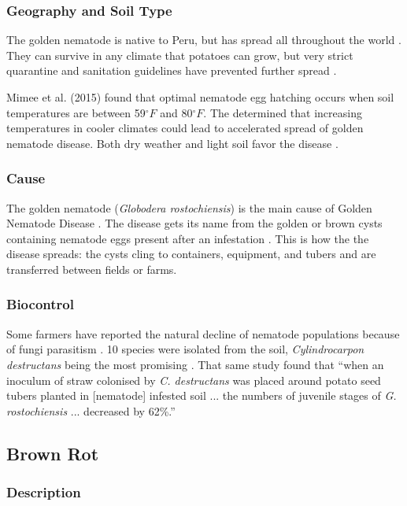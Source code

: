 \documentclass[12pt]{article}
\begin{document}
\subsubsection{Geography and Soil Type}

The golden nematode is native to Peru, but has spread all throughout the world \autocite{rich2013potato}. They can survive in any climate that potatoes can grow, but very strict quarantine and sanitation guidelines have prevented further spread \autocite{evans1980origin}.

Mimee et al. (2015) found that optimal nematode egg hatching occurs when soil temperatures are between 59$^\circ F$ and 80$^\circ F$. The determined that increasing temperatures in cooler climates could lead to accelerated spread of golden nematode disease. Both dry weather and light soil favor the disease \autocite{rich2013potato}.

\subsubsection{Cause}

The golden nematode (\emph{Globodera rostochiensis}) is the main cause of Golden Nematode Disease \autocite{rich2013potato}. The disease gets its name from the golden or brown cysts containing nematode eggs present after an infestation \autocite{rich2013potato}. This is how the the disease spreads: the cysts cling to containers, equipment, and tubers and are transferred between fields or farms.

\subsubsection{Biocontrol}

Some farmers have reported the natural decline of nematode populations because of fungi parasitism \autocite{evans1993reviews}. 10 species were isolated from the soil, \emph{Cylindrocarpon destructans} being the most promising \autocite{evans1993reviews}. That same study found that ``when an inoculum of straw colonised by \emph{C. destructans} was placed around potato seed tubers planted in [nematode] infested soil ... the numbers of juvenile stages of \emph{G. rostochiensis} ... decreased by 62\%.''


\subsection{Brown Rot}

\subsubsection{Description}
\end{document}

